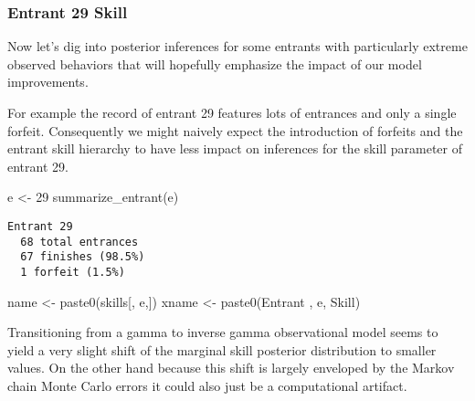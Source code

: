\documentclass[
  letterpaper,
  DIV=11,
  numbers=noendperiod]{scrartcl}
\newenvironment{Shaded}{\begin{snugshade}}{\end{snugshade}}
\newcommand{\DecValTok}[1]{\textcolor[rgb]{0.68,0.00,0.00}{#1}}
\newcommand{\FunctionTok}[1]{\textcolor[rgb]{0.28,0.35,0.67}{#1}}
\newcommand{\NormalTok}[1]{\textcolor[rgb]{0.00,0.23,0.31}{#1}}
\newcommand{\OtherTok}[1]{\textcolor[rgb]{0.00,0.23,0.31}{#1}}
\newcommand{\StringTok}[1]{\textcolor[rgb]{0.13,0.47,0.30}{#1}}
\begin{document}
\subsubsection{Entrant 29 Skill}\label{entrant-29-skill}

Now let's dig into posterior inferences for some entrants with
particularly extreme observed behaviors that will hopefully emphasize
the impact of our model improvements.

For example the record of entrant 29 features lots of entrances and only
a single forfeit. Consequently we might naively expect the introduction
of forfeits and the entrant skill hierarchy to have less impact on
inferences for the skill parameter of entrant 29.

\begin{Shaded}
\begin{Highlighting}[]
\NormalTok{e }\OtherTok{\textless{}{-}} \DecValTok{29}
\FunctionTok{summarize\_entrant}\NormalTok{(e)}
\end{Highlighting}
\end{Shaded}

\begin{verbatim}
Entrant 29
  68 total entrances
  67 finishes (98.5%)
  1 forfeit (1.5%)
\end{verbatim}

\begin{Shaded}
\begin{Highlighting}[]
\NormalTok{name }\OtherTok{\textless{}{-}} \FunctionTok{paste0}\NormalTok{(}\StringTok{\textquotesingle{}skills[\textquotesingle{}}\NormalTok{, e,}\StringTok{\textquotesingle{}]\textquotesingle{}}\NormalTok{)}
\NormalTok{xname }\OtherTok{\textless{}{-}} \FunctionTok{paste0}\NormalTok{(}\StringTok{\textquotesingle{}Entrant \textquotesingle{}}\NormalTok{, e, }\StringTok{\textquotesingle{} Skill\textquotesingle{}}\NormalTok{)}
\end{Highlighting}
\end{Shaded}

Transitioning from a gamma to inverse gamma observational model seems to
yield a very slight shift of the marginal skill posterior distribution
to smaller values. On the other hand because this shift is largely
enveloped by the Markov chain Monte Carlo errors it could also just be a
computational artifact.
\end{document}
